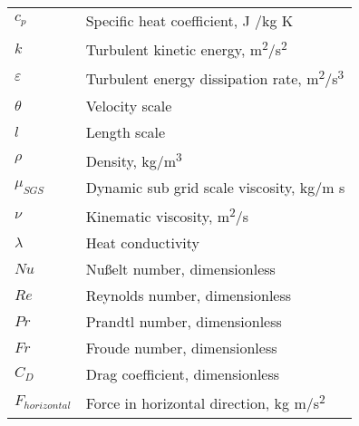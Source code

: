 \begin{table}[h]
\begin{tabular}{ll}
$c_p$&Specific heat coefficient, J /kg K\\
$k$&Turbulent kinetic energy, m\textsuperscript{2}/s\textsuperscript{2}\\
$\varepsilon$&Turbulent energy dissipation rate, m\textsuperscript{2}/s\textsuperscript{3}\\
$\theta$&Velocity scale\\
$l$&Length scale\\
$\rho$&Density, kg/m\textsuperscript{3}\\
$\mu_{SGS}$&Dynamic sub grid scale viscosity, kg/m s\\
$\nu$&Kinematic viscosity, m\textsuperscript{2}/s\\
$\lambda$&Heat conductivity\\
$Nu$&Nußelt number, dimensionless\\
$Re$&Reynolds number, dimensionless\\
$Pr$&Prandtl number, dimensionless\\
$Fr$&Froude number, dimensionless\\
$C_D$&Drag coefficient, dimensionless\\
$F_{horizontal}$&Force in horizontal direction, kg m/s\textsuperscript{2}\\

\end{tabular}
\end{table}